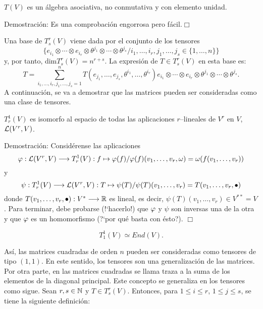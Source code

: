 \documentclass[cursovd_portada.tex]{subfiles}
\begin{document}
\begin{propoap}
$T(V)$ es un álgebra asociativa, no conmutativa y con elemento unidad.
\end{propoap}
{\sc Demostración:} Es una comprobación engorrosa pero fácil.\hfill$\Box$ \par\bigskip Una base de $T^r_s(V)$
viene dada por el conjunto de los tensores
$$\{e_{i_1}\otimes\cdots\otimes e_{i_r}\otimes\theta^{j_1}\otimes\cdots\otimes
\theta^{j_s}/i_1,\dots ,i_r,j_1,\dots ,j_s\in\{1,\dots,n\}\}$$ y, por tanto, dim$T^r_s(V)=n^{r+s}$. La expresión
de $T\in T^r_s(V)$ en esta base es:
$$T=\sum_{i_1,\dots ,i_r,j_1,\dots ,j_s=1}^nT(e_{j_1},\dots ,e_{j_s},\theta^
{i_1},\dots ,\theta^{i_r})e_{i_1}\otimes\cdots\otimes e_{i_r}\otimes\theta^
{j_1}\otimes\cdots\otimes\theta^{j_s}.$$ \hs A continuación, se va a demostrar que las matrices pueden ser
consideradas como una clase de tensores.
\begin{propoap}
$T^1_r(V)$ es isomorfo al espacio de todas las aplicaciones $r$--li\-nea\-les de $V^r$ en $V$, ${\cal L}(V^r,V)$.
\end{propoap}
{\sc Demostración:} Considérense las aplicaciones
$$\varphi:{\cal L}(V^r,V)\longrightarrow T^1_r(V):f\mapsto\varphi(f)/\varphi(f)(v_1,\dots ,
v_r,\omega)=\omega(f(v_1,\dots ,v_r))$$ y
$$\psi:T^1_r(V)\longrightarrow{\cal L}(V^r,V):T\mapsto\psi(T)/\psi(T)(v_1,\dots ,
v_r)=T(v_1,\dots ,v_r,\bullet)$$ donde $T(v_1,\dots ,v_r,\bullet):V^*\longrightarrow\mathbb{R}$ es lineal, es decir, $\psi(T)(v_1,
\dots ,v_r)\in V^{**}=V$. Para terminar, debe probarse (!`hacerlo!) que $\varphi$ y $\psi$ son inversas una de la otra
y que $\varphi$ es un homomorfismo (?`por qué basta con ésto?). \hfill$ \Box$
\begin{coroap}
$$T^1_1(V)\simeq End(V).$$
\end{coroap}
\par\bigskip
Así, las matrices cuadradas de orden $n$ pueden ser consideradas como tensores de tipo $(1,1)$. En este sentido,
los tensores son una generalización de las matrices. Por otra parte, en las matrices cuadradas se llama traza a la
suma de los elementos de la diagonal principal. Este concepto se generaliza en los tensores como sigue. Sean
$r,s\in\mathbb{N}$ y $T\in T^r_s(V)$. Entonces, para $1\leq i\leq r$, $1\leq j\leq s$, se tiene la siguiente definición:

\newpage
\end{document}
